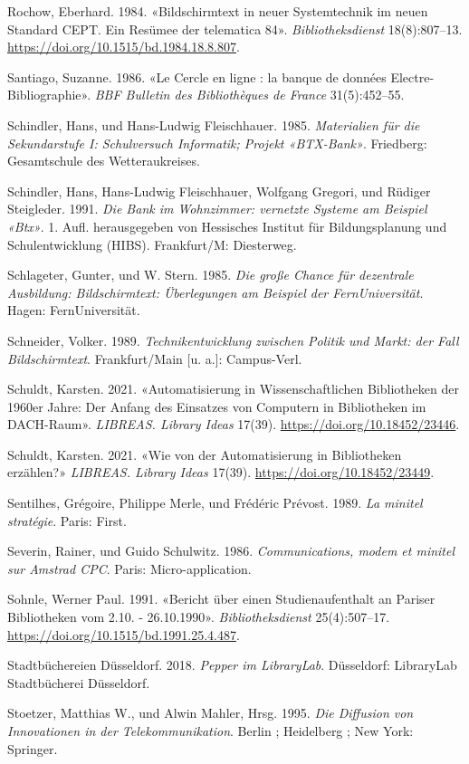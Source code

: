 \documentclass[a4paper,
fontsize=11pt,
oneside,
numbers=noperiodatend,
parskip=half-,
bibliography=totoc,
final
]{scrartcl}
\begin{document}
Rochow, Eberhard. 1984. «Bildschirmtext in neuer Systemtechnik im neuen
Standard CEPT. Ein Resümee der telematica 84». \emph{Bibliotheksdienst}
18(8):807--13. \url{https://doi.org/10.1515/bd.1984.18.8.807}.

Santiago, Suzanne. 1986. «Le Cercle en ligne : la banque de données
Electre-Bibliographie». \emph{BBF Bulletin des Bibliothèques de France}
31(5):452--55.

Schindler, Hans, und Hans-Ludwig Fleischhauer. 1985. \emph{Materialien
für die Sekundarstufe I: Schulversuch Informatik; Projekt «BTX-Bank»}.
Friedberg: Gesamtschule des Wetteraukreises.

Schindler, Hans, Hans-Ludwig Fleischhauer, Wolfgang Gregori, und Rüdiger
Steigleder. 1991. \emph{Die Bank im Wohnzimmer: vernetzte Systeme am
Beispiel «Btx»}. 1. Aufl. herausgegeben von Hessisches Institut für
Bildungsplanung und Schulentwicklung (HIBS). Frankfurt/M: Diesterweg.

Schlageter, Gunter, und W. Stern. 1985. \emph{Die große Chance für
dezentrale Ausbildung: Bildschirmtext: Überlegungen am Beispiel der
FernUniversität}. Hagen: FernUniversität.

Schneider, Volker. 1989. \emph{Technikentwicklung zwischen Politik und
Markt: der Fall Bildschirmtext}. Frankfurt/Main {[}u. a.{]}:
Campus-Verl.

Schuldt, Karsten. 2021. «Automatisierung in Wissenschaftlichen
Bibliotheken der 1960er Jahre: Der Anfang des Einsatzes von Computern in
Bibliotheken im DACH-Raum». \emph{LIBREAS. Library Ideas} 17(39).
\url{https://doi.org/10.18452/23446}.

Schuldt, Karsten. 2021. «Wie von der Automatisierung in Bibliotheken
erzählen?» \emph{LIBREAS. Library Ideas} 17(39).
\url{https://doi.org/10.18452/23449}.

Sentilhes, Grégoire, Philippe Merle, und Frédéric Prévost. 1989.
\emph{La minitel stratégie}. Paris: First.

Severin, Rainer, und Guido Schulwitz. 1986. \emph{Communications, modem
et minitel sur Amstrad CPC}. Paris: Micro-application.

Sohnle, Werner Paul. 1991. «Bericht über einen Studienaufenthalt an
Pariser Bibliotheken vom 2.10. - 26.10.1990». \emph{Bibliotheksdienst}
25(4):507--17. \url{https://doi.org/10.1515/bd.1991.25.4.487}.

Stadtbüchereien Düsseldorf. 2018. \emph{Pepper im LibraryLab}.
Düsseldorf: LibraryLab Stadtbücherei Düsseldorf.

Stoetzer, Matthias W., und Alwin Mahler, Hrsg. 1995. \emph{Die Diffusion
von Innovationen in der Telekommunikation}. Berlin ; Heidelberg ; New
York: Springer.
\end{document}
